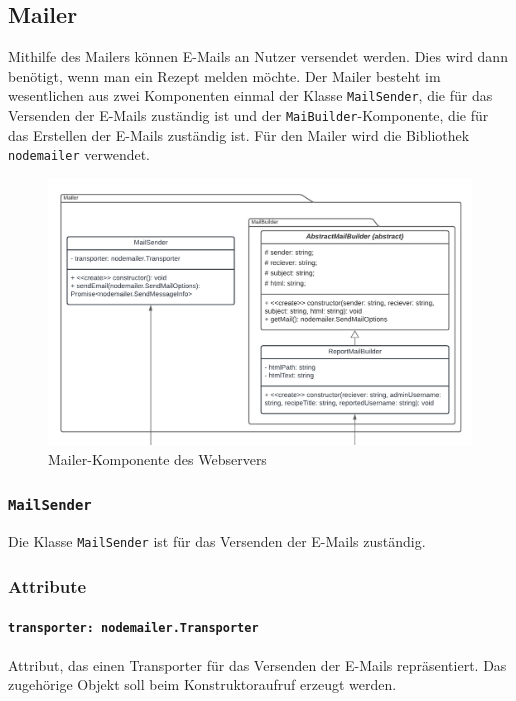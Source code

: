 \documentclass{entwurfsheft}
\begin{document}
\subsection{Mailer}
Mithilfe des Mailers können E-Mails an Nutzer versendet werden. Dies wird dann benötigt, wenn man ein Rezept melden möchte.
Der Mailer besteht im wesentlichen aus zwei Komponenten einmal der Klasse \texttt{MailSender}, die für das Versenden der E-Mails zuständig ist und der \texttt{MaiBuilder}-Komponente, die für das Erstellen der E-Mails zuständig ist.
Für den Mailer wird die Bibliothek \texttt{nodemailer} verwendet.

\begin{figure}[htp]
    \centering
    \includegraphics[width = 1\textwidth]{images/webserver/mailer.pdf}
    \caption{Mailer-Komponente des Webservers}
    \label{fig:mailer}
\end{figure}

\subsubsection{\texttt{MailSender}}\label{sec:MailSender}
Die Klasse \texttt{MailSender} ist für das Versenden der E-Mails zuständig.

\subsubsection*{Attribute}
\paragraph{\texttt{transporter: nodemailer.Transporter}}
Attribut, das einen Transporter für das Versenden der E-Mails repräsentiert. Das zugehörige Objekt soll beim Konstruktoraufruf erzeugt werden.
\end{document}
